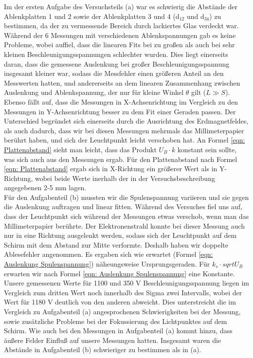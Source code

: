 \documentclass[12pt]{scrartcl}
\begin{document}
Im der ersten Aufgabe des Versuchsteils (a)
war es schwierig die Abstände der Ablenkplatten 1 und 2 sowie der Ablenkplatten 3 und 4 (d$_{12}$ und d$_{34}$) zu bestimmen, da der zu vermessende Bereich  durch lackiertes Glas verdeckt war.\\
Während der 6 Messungen mit verschiedenen Ablenkspannungen gab es keine Probleme, wobei auffiel, dass die linearen Fits bei zu großen als auch bei sehr kleinen Beschleunigungsspannungen schlechter wurden.
Dies liegt einerseits daran, dass die gemessene Auslenkung bei großer Beschleunigungsspannung insgesamt kleiner war, sodass die Messfehler einen größeren Anteil an den Messwerten hatten, und andererseits an dem linearen Zusammenhang zwischen Auslenkung und Ablenkspannung, der nur für kleine Winkel $\theta$ gilt ($L \gg S$).
Ebenso fällt auf, dass die Messungen in X-Achsenrichtung im Vergleich zu den Messungen in Y-Achsenrichtung besser zu dem Fit einer Geraden passen. Der Unterschied begründet sich einerseits durch die Ausrichtung des Erdmagnetfeldes, als auch dadurch, dass wir bei diesen Messungen mehrmals das Millimeterpapier berührt haben, und sich der Leuchtpunkt leicht verschoben hat.
An Formel \ref{eqn: Plattenabstand} sieht man leicht, dass das Produkt $U_B \cdot k$ konstant sein sollte, was sich auch aus den Messungen ergab.
Für den Plattenabstand nach Formel \ref{eqn: Plattenabstand} ergab sich in X-Richtung ein größerer Wert als in Y-Richtung, wobei beide Werte inerhalb der in der Versuchsbeschreibung angegebenen 2-5 mm lagen.\\
Für den Aufgabenteil (b) mussten wir die Spulenspannung variieren und sie gegen die Auslenkung auftragen und linear fitten.
Während des Versuches fiel uns auf, dass der Leuchtpunkt sich während der Messungen etwas verschob, wenn man das Millimeterpapier berührte. Der Elektronenstrahl konnte bei dieser Messung auch nur in eine Richtung ausgelenkt werden, sodass sich der Leuchtpunkt auf dem Schirm mit dem Abstand zur Mitte verformte. Deshalb haben wir doppelte Ablesefehler angenommen.
Es ergaben sich wie erwartet (Formel \ref{eqn: Auslenkung Spulenspannung}) näheungsweise Ursprungsgeraden.
Für $k_s \cdot sqrt{U_B}$ erwarten wir nach Formel \ref{eqn: Auslenkung Spulenspannung} eine Konstante. Unsere gemessenen Werte für 1100 und 350 V Beschleunigungsspannung liegen im Vergleich zum dritten Wert noch innerhalb des Sigma zwei Intervalls, wobei der Wert für 1180 V deutlich von den anderen abweicht.
Dies unterstreicht die im Vergleich zu Aufgabenteil (a) angesprochenen Schwierigkeiten bei der Messung, sowie zusätzliche Probleme bei der Fokussierung des Lichtpunktes auf dem Schirm.
Wie auch bei den Messungen in Aufgabenteil (a) kommt hinzu, dass äußere Felder Einfluß auf unsere Messungen hatten.
Insgesamt waren die Abstände in Aufgabenteil (b) schwieriger zu bestimmen als in (a).

 
\end{document}

